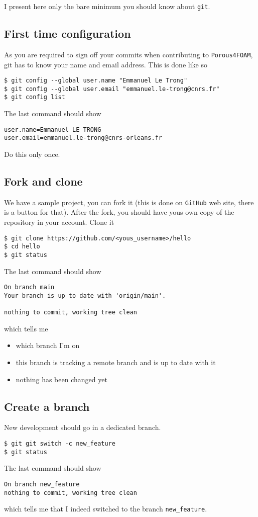 \documentclass[a4paper]{article}
\newcommand{\PF}{\texttt{Porous4FOAM}\xspace}
\newcommand{\GIT}{\texttt{git}\xspace}
\newcommand{\GH}{\texttt{GitHub}\xspace}
\begin{document}
I present here only the bare minimum you should know about \GIT.

\subsection{First time configuration}
As you are required to sign off your commits when contributing to \PF, git has
to know your name and email address. This is done like so
\begin{verbatim}
$ git config --global user.name "Emmanuel Le Trong"
$ git config --global user.email "emmanuel.le-trong@cnrs.fr"
$ git config list
\end{verbatim}
The last command should show
\begin{verbatim}
user.name=Emmanuel LE TRONG
user.email=emmanuel.le-trong@cnrs-orleans.fr
\end{verbatim}
Do this only once. 

\subsection{Fork and clone}
We have a sample project, you can fork it (this is done on \GH web site, there
is a button for that). After the fork, you should have yous own copy of the
repository in your account. Clone it
\begin{verbatim}
$ git clone https://github.com/<yous_username>/hello
$ cd hello
$ git status
\end{verbatim}
The last command should show
\begin{verbatim}
On branch main
Your branch is up to date with 'origin/main'.

nothing to commit, working tree clean
\end{verbatim}
which tells me
\begin{itemize}
    \item which branch I'm on
    \item this branch is tracking a remote branch and is up to date with it
    \item nothing has been changed yet
\end{itemize}

\subsection{Create a branch}
New development should go in a dedicated branch.
\begin{verbatim}
$ git git switch -c new_feature
$ git status
\end{verbatim}
The last command should show
\begin{verbatim}
On branch new_feature
nothing to commit, working tree clean
\end{verbatim}
which tells me that I indeed switched to the branch \texttt{new\_feature}.
\end{document}
